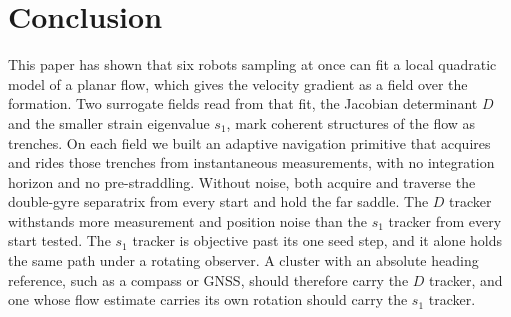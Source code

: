 \documentclass[lettersize,journal]{IEEEtran}
\begin{document}
\section{Conclusion}

This paper has shown that six robots sampling at once can fit a local
quadratic model of a planar flow, which gives the velocity gradient as a
field over the formation. Two surrogate fields read from that fit, the
Jacobian determinant $D$ and the smaller strain eigenvalue $s_1$, mark
coherent structures of the flow as trenches. On each field we built an
adaptive navigation primitive that acquires and rides those trenches from
instantaneous measurements, with no integration horizon and no
pre-straddling. Without noise, both acquire and traverse the
double-gyre separatrix from every start and hold the far saddle. The $D$
tracker withstands more measurement and position noise than the $s_1$
tracker from every start tested. The $s_1$ tracker is objective past its
one seed step, and it alone holds the same path under a rotating observer.
A cluster with an absolute heading reference, such as a compass or GNSS,
should therefore carry the $D$ tracker, and one whose flow estimate
carries its own rotation should carry the $s_1$ tracker.
\end{document}
